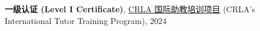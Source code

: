 \textbf{一级认证 (Level I Certificate)}, \href{https://crla.net/page/ITTPC}{CRLA 国际助教培训项目} (CRLA's International Tutor Training Program), 2024
